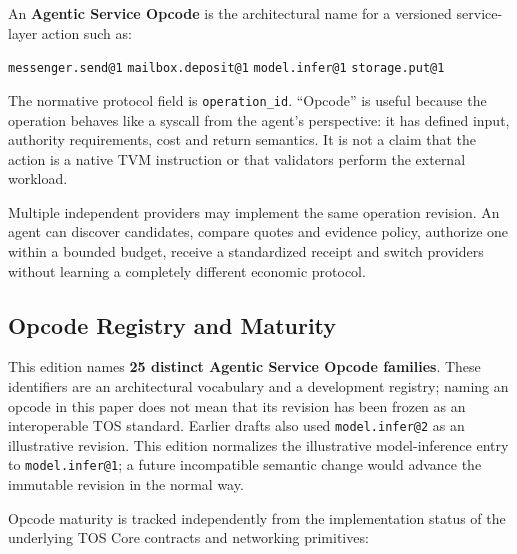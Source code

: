 \documentclass[11pt,oneside]{article}
\newcommand{\opid}[1]{\texttt{#1}}
\begin{document}
An \textbf{Agentic Service Opcode} is the architectural name for a versioned service-layer
action such as:

\begin{center}
\opid{messenger.send@1}\quad
\opid{mailbox.deposit@1}\quad
\opid{model.infer@1}\quad
\opid{storage.put@1}
\end{center}

The normative protocol field is \texttt{operation\_id}. ``Opcode'' is useful because the
operation behaves like a syscall from the agent's perspective: it has defined input, authority
requirements, cost and return semantics. It is not a claim that the action is a native TVM
instruction or that validators perform the external workload.

Multiple independent providers may implement the same operation revision. An agent can
discover candidates, compare quotes and evidence policy, authorize one within a bounded
budget, receive a standardized receipt and switch providers without learning a completely
different economic protocol.

\subsection{Opcode Registry and Maturity}
\label{sec:opcode-registry}

This edition names \textbf{25 distinct Agentic Service Opcode families}. These identifiers are
an architectural vocabulary and a development registry; naming an opcode in this paper does
not mean that its revision has been frozen as an interoperable TOS standard. Earlier drafts
also used \opid{model.infer@2} as an illustrative revision. This edition normalizes the
illustrative model-inference entry to \opid{model.infer@1}; a future incompatible semantic
change would advance the immutable revision in the normal way.

Opcode maturity is tracked independently from the implementation status of the underlying TOS
Core contracts and networking primitives:
\end{document}

